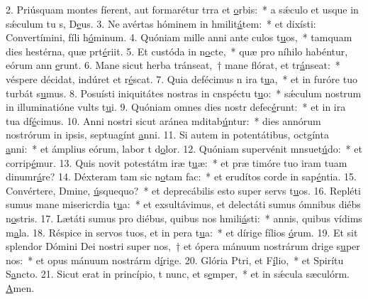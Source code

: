 2. Priúsquam montes fíerent, aut formarétur trra et \uline{o}rbis:~* a sǽculo et usque in sǽculum tu s, D\uline{e}us.
3. Ne avértas hóminem in hmilit\uline{á}tem:~* et dixísti: Convertímini, fíli h\uline{ó}minum.
4. Quóniam mille anni ante culos t\uline{u}os,~* tamquam dies hestérna, quæ prt\uline{é}riit.
5. Et custóda in n\uline{o}cte,~* quæ pro níhilo habéntur, eórum ann \uline{e}runt.
6. Mane sicut herba tránseat,~† mane flórat, et tr\uline{á}nseat:~* véspere décidat, indúret et r\uline{é}scat.
7. Quia defécimus n ira t\uline{u}a,~* et in furóre tuo turbát s\uline{u}mus.
8. Posuísti iniquitátes nostras in cnspéctu t\uline{u}o:~* sǽculum nostrum in illuminatióne vults t\uline{u}i.
9. Quóniam omnes dies nostr defec\uline{é}runt:~* et in ira tua df\uline{é}cimus.
10. Anni nostri sicut aránea mditab\uline{ú}ntur:~* dies annórum nostrórum in ipsis, septuagínt \uline{a}nni.
11. Si autem in potentátibus, octgínta \uline{a}nni:~* et ámplius eórum, labor t d\uline{o}lor.
12. Quóniam supervénit mnsuet\uline{ú}do:~* et corrip\uline{é}mur.
13. Quis novit potestátm iræ t\uline{u}æ:~* et præ timóre tuo iram tuam dinumr\uline{á}re?
14. Déxteram tam sic n\uline{o}tam fac:~* et erudítos corde in sap\uline{é}ntia.
15. Convértere, Dmine, \uline{ú}squequo?~* et deprecábilis esto super servs t\uline{u}os.
16. Repléti sumus mane misericrdia t\uline{u}a:~* et exsultávimus, et delectáti sumus ómnibus diébs n\uline{o}stris.
17. Lætáti sumus pro diébus, quibus nos hmili\uline{á}sti:~* annis, quibus vídims m\uline{a}la.
18. Réspice in servos tuos, et in pera t\uline{u}a:~* et dírige fílios \uline{ó}rum.
19. Et sit splendor Dómini Dei nostri super nos,~† et ópera mánuum nostrárum drige s\uline{u}per nos:~* et opus mánuum nostrárm d\uline{í}rige.
20. Glória Ptri, et F\uline{í}lio,~* et Spirítu S\uline{a}ncto.
21. Sicut erat in princípio, t nunc, et s\uline{e}mper,~* et in sǽcula sæculórm. \uline{A}men.
